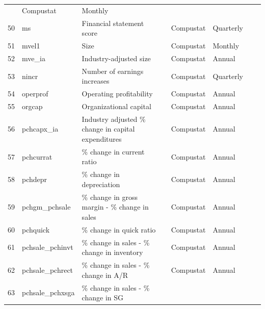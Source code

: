 \documentclass[a4paper, table]{article}
\begin{document}
\begin{landscape}
\begin{center}
\begin{longtable}{llllllll}
				\cite{jegadeesh_returns_1993} & Compustat & Monthly \\
			50 & ms & Financial statement score & 
				\cite{mohanram_separating_2005} & Compustat & Quarterly \\
			51 & mvel1 & Size & 
				\cite{banz_relationship_1981} & Compustat & Monthly \\
			52 & mve\_ia & Industry-adjusted size & 
				\cite{asness_predicting_2000} & Compustat & Annual \\
			53 & nincr & Number of earnings increases & 
				\cite{barth_market_1999} & Compustat & Quarterly \\
			54 & operprof\footnotemark[\value{footnote}] & Operating profitability & 
				\cite{fama_five-factor_2015} & Compustat & Annual \\
			55 & orgcap\footnotemark[\value{footnote}] & Organizational capital & 
				\cite{eisfeldt_organization_2013} & Compustat & Annual \\
			56 & pchcapx\_ia\footnotemark[\value{footnote}] & Industry adjusted \% change in capital expenditures & 
				\cite{abarbanell_abnormal_1998} & Compustat & Annual \\
			57 & pchcurrat\footnotemark[\value{footnote}] & \% change in current ratio & 
				\cite{ou_financial_1989} & Compustat & Annual \\
			58 & pchdepr\footnotemark[\value{footnote}] & \% change in depreciation & 
				\cite{holthausen_prediction_1992} & Compustat & Annual \\
			59 & pchgm\_pchsale\footnotemark[\value{footnote}] & \% change in gross margin - \% change in sales & 
				\cite{abarbanell_abnormal_1998} & Compustat & Annual \\
			60 & pchquick\footnotemark[\value{footnote}] & \% change in quick ratio & 
				\cite{ou_financial_1989} & Compustat & Annual \\
			61 & pchsale\_pchinvt\footnotemark[\value{footnote}] & \% change in sales - \% change in inventory & 
				\cite{abarbanell_abnormal_1998} & Compustat & Annual \\
			62 & pchsale\_pchrect\footnotemark[\value{footnote}] & \% change in sales - \% change in A/R & 
				\cite{abarbanell_abnormal_1998} & Compustat & Annual \\
			63 & pchsale\_pchxsga\footnotemark[\value{footnote}] & \% change in sales - \% change in SG & 

\end{longtable}
\end{center}
\end{landscape}
\end{document}
